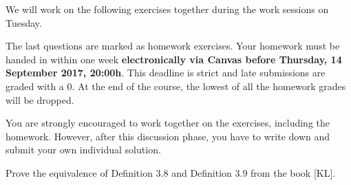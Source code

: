 \documentclass[a4paper,10pt,landscape,twocolumn]{scrartcl}
\newcommand\deadline{Thursday, 14 September 2017, 20:00h}
\begin{document}
\problems

{\sffamily\noindent
We will work on the following exercises together during the work sessions on Tuesday. 

The last questions are marked as homework exercises. 
Your homework must be handed in within one week \textbf{electronically via Canvas before \deadline}. This deadline is strict and late submissions are graded with a 0. At the end of the course, the lowest of all the homework grades will be dropped. 

You are strongly encouraged to work together on the exercises, including the homework. However, after this discussion phase, you have to write down and submit your own individual solution. }


\begin{exercise}[Exercise 3.4]
Prove the equivalence of Definition 3.8 and Definition 3.9 from the book [KL].


\end{exercise}
  
\end{document}
